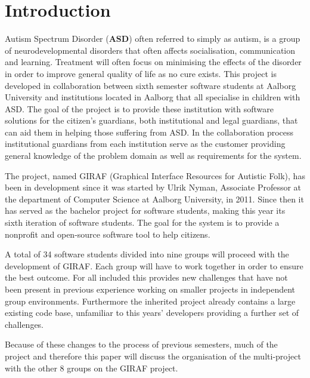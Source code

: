 \chapter{Introduction}
Autism Spectrum Disorder (\textbf{ASD}) often referred to simply as autism, is a 
group of neurodevelopmental disorders that often affects socialisation, communication and learning.
Treatment will often focus on minimising the effects of the disorder in order to improve general quality of life as no cure exists.
This project is developed in collaboration between sixth semester software students at Aalborg University and institutions located in Aalborg that all specialise in children with ASD.
The goal of the project is to provide these institution with software solutions for the citizen's guardians, both institutional and legal guardians, that can aid them in helping those suffering from ASD.
In the collaboration process institutional guardians from each institution serve as the customer providing general knowledge of the problem domain as well as requirements for the system.

The project, named GIRAF (Graphical Interface Resources for Autistic Folk), has been in development since it was started by Ulrik Nyman, Associate Professor at the department of Computer Science at Aalborg University, in 2011. 
Since then it has served as the bachelor project for software students, making this year its sixth iteration of software students.
The goal for the system is to provide a nonprofit and open-source software tool to help citizens.

A total of 34 software students divided into nine groups will proceed with the development of GIRAF.
Each group will have to work together in order to ensure the best outcome.
For all included this provides new challenges that have not been present in previous experience working on smaller projects in independent group environments.
Furthermore the inherited project already contains a large existing code base, unfamiliar to this years' developers providing a further set of challenges.

Because of these changes to the process of previous semesters, much of the project and therefore this paper will discuss the organisation of the multi-project with the other 8 groups on the GIRAF project.
